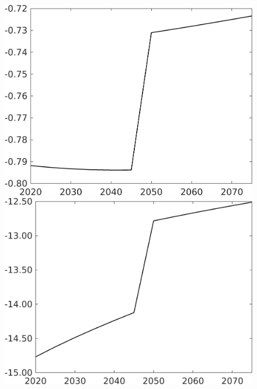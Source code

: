 \documentclass[12pt]{article}
\begin{document}
\begin{figure}[h!!]
\begin{minipage}[]{0.32\textwidth}
	\end{minipage}	
	\begin{minipage}[]{0.32\textwidth}
		\includegraphics[width=1\textwidth]{../../codding_model/own_basedOnFried/optimalPol_010922_revision/figures/all_13Sept22/CompTaufPER_bytaul_Reg0_Lf_spillover0_nsk0_xgr1_knspil0_sep0_LFlimit1_emsbase0_countec0_GovRev0_etaa0.79_lgd0.png}
	\end{minipage}		
	\begin{minipage}[]{0.32\textwidth}
		\includegraphics[width=1\textwidth]{../../codding_model/own_basedOnFried/optimalPol_010922_revision/figures/all_13Sept22/CompTaufPER_bytaul_Reg0_Lg_spillover0_nsk0_xgr1_knspil0_sep0_LFlimit1_emsbase0_countec0_GovRev0_etaa0.79_lgd0.png}

\end{minipage}
\end{figure}
\end{document}
